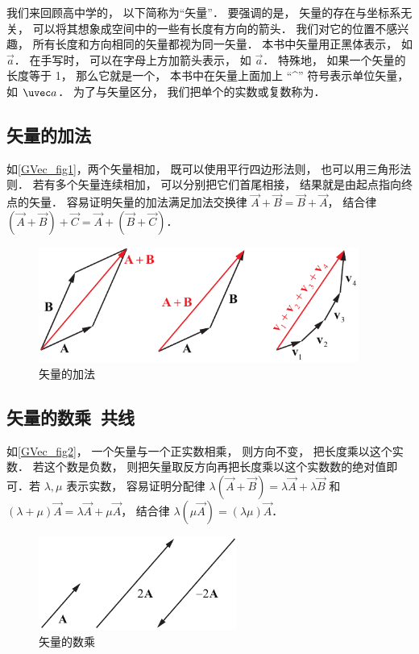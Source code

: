 
我们来回顾高中学的， 以下简称为“矢量”． 要强调的是， 矢量的存在与坐标系无关， 可以将其想象成空间中的一些有长度有方向的箭头． 我们对它的位置不感兴趣， 所有长度和方向相同的矢量都视为同一矢量． 本书中矢量用正黑体表示， 如 $\vec a$． 在手写时， 可以在字母上方加箭头表示， 如 $\overrightarrow{a}$． 特殊地， 如果一个矢量的长度等于 1， 那么它就是一个， 本书中在矢量上面加上 “\^{}” 符号表示单位矢量， 如 $\uvec a$． 为了与矢量区分， 我们把单个的实数或复数称为．

\subsection{矢量的加法}
如\autoref{GVec_fig1}，两个矢量相加， 既可以使用平行四边形法则， 也可以用三角形法则． 若有多个矢量连续相加， 可以分别把它们首尾相接， 结果就是由起点指向终点的矢量． 容易证明矢量的加法满足加法交换律 $\vec A + \vec B = \vec B + \vec A$， 结合律 $(\vec A + \vec B) + \vec C = \vec A + (\vec B + \vec C)$．
\begin{figure}[ht]
\centering
\includegraphics[width=10.5cm]{./figures/GVec1.pdf}
\caption{矢量的加法} \label{GVec_fig1}
\end{figure}

\subsection{矢量的数乘\ 共线}
如\autoref{GVec_fig2}， 一个矢量与一个正实数相乘， 则方向不变， 把长度乘以这个实数． 若这个数是负数， 则把矢量取反方向再把长度乘以这个实数数的绝对值即可．若 $\lambda, \mu$ 表示实数， 容易证明分配律 $\lambda(\vec A + \vec B) = \lambda\vec A + \lambda\vec B$ 和 $(\lambda+\mu)\vec A = \lambda\vec A + \mu\vec A$， 结合律 $\lambda(\mu\vec A) = (\lambda\mu) \vec A$．
\begin{figure}[ht]
\centering
\includegraphics[width=6.5cm]{./figures/GVec2.pdf}
\caption{矢量的数乘} \label{GVec_fig2}
\end{figure}

